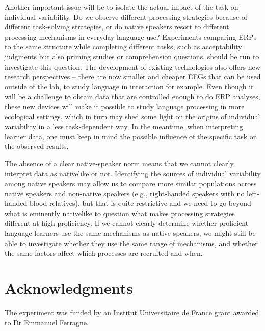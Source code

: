\documentclass[output=paper,colorlinks,citecolor=brown,modfonts,nonflat]{../langscibook}
\begin{document}
Another important issue will be to isolate the actual impact of the task on individual variability. Do we observe different processing strategies because of different task-solving strategies, or do native speakers resort to different processing mechanisms in everyday language use? Experiments comparing ERPs to the same structure while completing different tasks, such as acceptability judgments but also priming studies or comprehension questions, should be run to investigate this question. The development of existing technologies also offers new research perspectives – there are now smaller and cheaper EEGs that can be used outside of the lab, to study language in interaction for example. Even though it will be a challenge to obtain data that are controlled enough to do ERP analyses, these  new devices will make it possible to study language processing in more ecological settings, which in turn may shed some light on the origins of individual variability in a less task-dependent way. In the meantime, when interpreting learner data, one must keep in mind the possible influence of the specific task on the observed results. 

The absence of a clear native-speaker norm means that we cannot clearly interpret data as nativelike or not. Identifying the sources of individual variability among native speakers may allow us to compare more similar populations across native speakers and non-native speakers (e.g., right-handed speakers with no left-handed blood relatives), but that is quite restrictive and we need to go beyond what is eminently nativelike to question what makes processing strategies different at high proficiency. If we cannot clearly determine whether proficient language learners use the same mechanisms as native speakers, we might still be able to investigate whether they use the same range of mechanisms, and whether the same factors affect which processes are recruited and when. 

\section*{Acknowledgments}
The experiment was funded by an Institut Universitaire de France grant awarded to Dr Emmanuel Ferragne.

{\sloppy\printbibliography[heading=subbibliography,notkeyword=this]}
\end{document}
